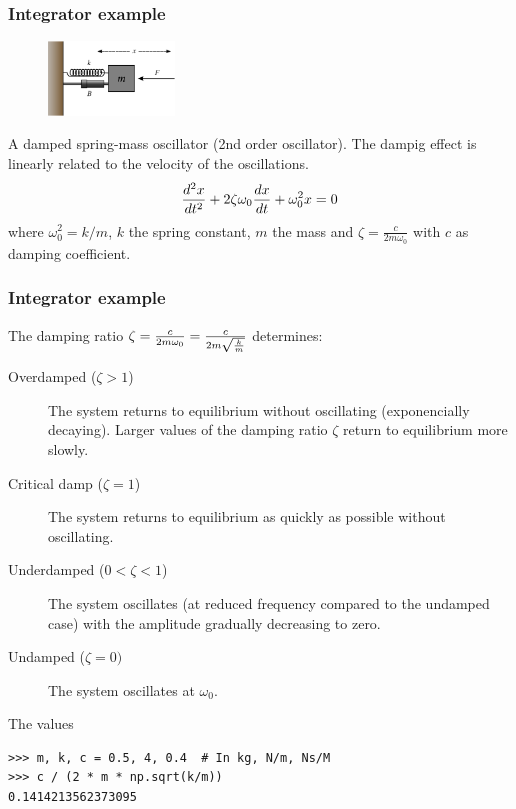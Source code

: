 \documentclass[10pt,colorlinks]{beamer}
\begin{document}
\begin{frame}[fragile]\frametitle{Integrator example}
  \begin{figure}[!htb]
      \centering
      \includegraphics[width=0.3\textwidth]{figs/damper}
  \end{figure}
A damped spring-mass oscillator (2nd order oscillator). The dampig effect is linearly related to the velocity of the oscillations.
\begin{equation}
     {d^2x \over dt^2} + 2 \zeta \omega_0 {dx \over dt} + \omega_0^2 x =0
\end{equation}
where $ \omega_0^2 = k/m $, $k$ the spring constant, $m$ the mass and $\zeta =\frac{c}{2 m \omega_0}$ with $c$ as damping coefficient.


\end{frame}
\begin{frame}[fragile]\frametitle{Integrator example}

The damping ratio $\zeta=\frac{c}{2 m \omega_0}=\frac{c}{2m\sqrt{k\over m}}$ determines: 
\begin{description}

    \item[Overdamped ($\zeta > 1$)] The system returns to equilibrium without oscillating (exponencially decaying). Larger values of the damping ratio $\zeta$ return to equilibrium more slowly.
    \item[Critical damp  ($\zeta = 1$)] The system returns to equilibrium as quickly as possible without oscillating.
    \item[Underdamped ($0 < \zeta < 1$)] The system oscillates (at reduced frequency compared to the undamped case) with the amplitude gradually decreasing to zero.
    \item[Undamped ($\zeta = 0)$] The system oscillates at $\omega_0$.

\end{description}
The values
\begin{verbatim}
>>> m, k, c = 0.5, 4, 0.4  # In kg, N/m, Ns/M
>>> c / (2 * m * np.sqrt(k/m))
0.1414213562373095
\end{verbatim}

\end{frame}
\end{document}
